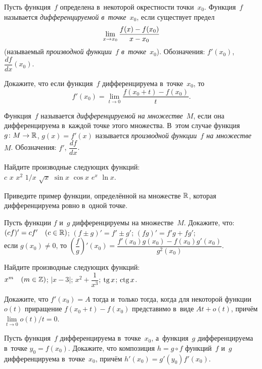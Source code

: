 \documentclass[a4paper,12pt]{article}
\begin{document}

Пусть функция~$f$ определена в~некоторой окрестности точки~$x_0$. Функция~$f$ называется {\it дифференцируемой в~точке~$x_0$}, если существует предел
\vspace*{-3mm}$$\limx{x_0} \dfrac{f(x)-f(x_0)}{x-x_0}\vspace*{-6mm}$$
(называемый \emph{производной функции~$f$ в~точке}~$x_0$). Обозначения: $f'(x_0)$, $\dfrac{df}{dx}(x_0)$.

Докажите, что если функция~$f$ дифференцируема в~точке~$x_0$, то
\[
f'(x_0)=\lim\limits_{t\to 0}\dfrac{f(x_0+t)-f(x_0)}{t}.
\]

Функция~$f$ называется \emph{дифференцируемой на множестве}~$M$, если она дифференцируема в~каждой точке этого множества. В~этом случае функция $g\colon M \rightarrow \mathbb{R}$, $g(x) = f'(x)$ называется \emph{производной функции~$f$ на множестве}~$M$. Обозначения: $f'$, $\dfrac{df}{dx}$.

Найдите производные следующих функций:\medskip\\
$c$\qquad
{}
$x$\qquad
{}
$x^2$\qquad
{}
$1/x$\qquad
{}
$\sqrt{x}$\qquad
{}
$\sin x$\qquad
{}
$\cos x$\qquad
{}
$e^x$\qquad
{}
$\ln x$.

Приведите пример функции, определённой на множестве $\mathbb{R}$, которая дифференцируема ровно в~одной точке.

Пусть функции $f$ и~$g$ дифференцируемы на множестве~$M$. Докажите,
что:
\medskip\\
$(cf)'=cf' \quad (c\in\mathbb{R})$;
$(f\pm g)'=f'\pm g'$;
$(fg)' = f'g+fg'$;
\medskip\\
если $g(x_0) \ne 0$, то $\left(\dfrac{f}{g}\right)'(x_0) = \dfrac{f'(x_0)g(x_0) - f(x_0)g'(x_0)}{g^2(x_0)}$.

Найдите производные следующих функций:\\
$x^m \quad (m\in\mathbb{Z})$;
$|x-3|$;
$x^2+\dfrac{1}{x^3}$;
$\tg x$;
$\ctg x$.

Докажите, что $f'(x_0)=A$ тогда и~только тогда, когда для некоторой функции~$o(t)$  приращение $f(x_0+t)-f(x_0)$ представимо в~виде $At+o(t)$, причём $\lim\limits_{t\to 0}o(t)/t = 0$.

Пусть функция~$f$ дифференцируема в~точке~$x_0$, а~функция~$g$ дифференцируема в~точке $y_0 = f(x_0)$. Докажите, что композиция $h=g\circ f$ функций~$f$ и~$g$ дифференцируема в~точке~$x_0$, причём $h'(x_0) = g'(y_0)f'(x_0)$.
\end{document}
